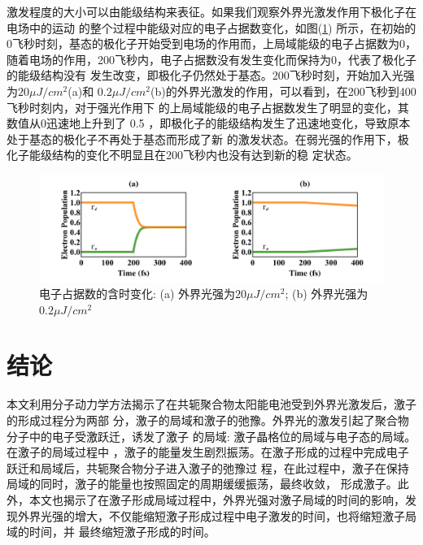\documentclass[12pt,]{report}
\begin{document}
激发程度的大小可以由能级结构来表征。如果我们观察外界光激发作用下极化子在电场中的运动
的整个过程中能级对应的电子占据数变化，如图(\ref{fig:pop20})
所示，在初始的0飞秒时刻，基态的极化子开始受到电场的作用而，上局域能级的电子占据数为0，
随着电场的作用，200飞秒内，电子占据数没有发生变化而保持为0，代表了极化子的能级结构没有
发生改变，即极化子仍然处于基态。200飞秒时刻，开始加入光强为\(20\mu J/cm^2\)(a)和
\(0.2\mu J/cm^2\)(b)的外界光激发的作用，可以看到，在200飞秒到400飞秒时刻内，对于强光作用下
的上局域能级的电子占据数发生了明显的变化，其数值从0迅速地上升到了 0.5
，即极化子的能级结构发生了迅速地变化，导致原本处于基态的极化子不再处于基态而形成了新
的激发状态。在弱光强的作用下，极化子能级结构的变化不明显且在200飞秒内也没有达到新的稳
定状态。

\begin{figure}[h!]
    \centering
    \includegraphics[scale=0.5]{./figures/population20.png}
    \caption{电子占据数的含时变化: (a) 外界光强为$20\mu J/cm^2$; (b) 外界光强为
    $0.2\mu J/cm^2$}
    \label{fig:pop20}
\end{figure}

\clearpage
\clearpage\pagestyle{empty}\mbox{}\clearpage

\pagestyle{fancy}

\chapter{结论}\label{ux7ed3ux8bba}

本文利用分子动力学方法揭示了在共轭聚合物太阳能电池受到外界光激发后，激子的形成过程分为两部
分，激子的局域和激子的弛豫。外界光的激发引起了聚合物分子中的电子受激跃迁，诱发了激子
的局域: 激子晶格位的局域与电子态的局域。在激子的局域过程中
，激子的能量发生剧烈振荡。在激子形成的过程中完成电子跃迁和局域后，共轭聚合物分子进入激子的弛豫过
程，在此过程中，激子在保持局域的同时，激子的能量也按照固定的周期缓缓振荡，最终收敛，
形成激子。此外，本文也揭示了在激子形成局域过程中，外界光强对激子局域的时间的影响，发
现外界光强的增大，不仅能缩短激子形成过程中电子激发的时间，也将缩短激子局域的时间，并
最终缩短激子形成的时间。
\end{document}
